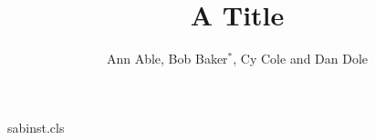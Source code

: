 \begin{filecontents*}[overwrite]{sabinst.cls}
\newdimen\instindent
\def\institute#1{\gdef\@institute{#1}}
\def\institutename{\par
 \begingroup
 \parindent=0pt
 \parskip=0pt
 \refstepcounter{inst}%
 \def\and{\par\refstepcounter{inst}%
 \hangindent\instindent
 \noindent
 \hbox to\instindent{\hss$^{\theinst}$\enspace}\ignorespaces}%
 \setbox0=\vbox{\def\thanks##1{}\@institute}
 \ifnum\value{inst}>9\relax\setbox0=\hbox{$^{88}$\enspace}%
                 \else\setbox0=\hbox{$^{8}$\enspace}\fi
 \instindent=\wd0\relax
 \ifnum\value{inst}=1\relax
 \else
   \setcounter{inst}{1}%
   \hangindent\instindent
   \noindent
   \hbox to\instindent{\hss$^{\theinst}$\enspace}\ignorespaces
 \fi
 \small
 \ignorespaces
 \@institute\par
 \endgroup}
\def\inst#1{\unskip$^{#1}$}
\def\@maketitle{\newpage\noindent{\Large\@title\par}\vskip6pt
  {\large\noindent\ignorespaces\@author\par}\vskip6pt
  \small\rm\leftskip=.8cm\rightskip=\leftskip\institutename}
\end{filecontents*}
\documentclass{sabinst}

\title{A Title}
\author{Ann Able, Bob Baker$^{*}$, Cy Cole and Dan Dole}
\maketitle
Text.

